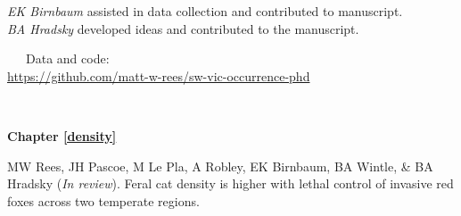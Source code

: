 \documentclass[11pt,a4paper,titlepage,twoside,openright]{style/unimelbthesis}
\begin{document}
\begin{frontmatter}
\begin{preface}
    \hspace*{0.333em}\hspace*{0.333em}\hspace*{0.333em}\hspace*{0.333em}\hspace*{0.333em}\hspace*{0.333em}\hspace*{0.333em}\hspace*{0.333em}\emph{EK Birnbaum} assisted in data collection and contributed to manuscript.\\
    \hspace*{0.333em}\hspace*{0.333em}\hspace*{0.333em}\hspace*{0.333em}\hspace*{0.333em}\hspace*{0.333em}\hspace*{0.333em}\hspace*{0.333em}\emph{BA Hradsky} developed ideas and contributed to the manuscript.
    
    ~~~Data and code:\\
    \url{https://github.com/matt-w-rees/sw-vic-occurrence-phd}
    
    \(~\)
    
    \textbf{Chapter \ref{density}}
    
    MW Rees, JH Pascoe, M Le Pla, A Robley, EK Birnbaum, BA Wintle, \& BA Hradsky (\emph{In review}). Feral cat density is higher with lethal control of invasive red foxes across two temperate regions.
    

\end{preface}
\end{frontmatter}
\end{document}
